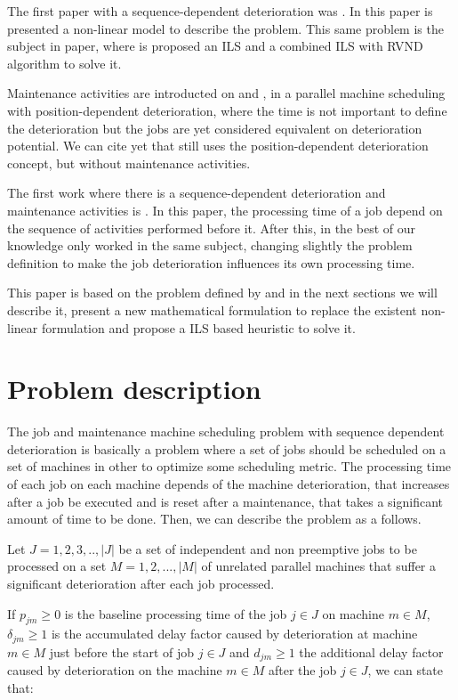 \documentclass[a4paper,11pt]{article}
\begin{document}
 The first paper with a sequence-dependent deterioration was \citep{RUIZTORRES20132051}. In this paper is presented a non-linear model to describe the problem. This same problem is the subject in \citep{SantosArroyo2015} paper, where is proposed an ILS and a combined ILS with RVND algorithm to solve it. 
 
Maintenance activities are introducted on \citep{Yang2011} and \citep{YANG20121458}, in a parallel machine scheduling with position-dependent deterioration, where the time is not important to define the deterioration but the jobs are yet considered equivalent on deterioration potential. We can cite yet \citep{HUANG20152897} that still uses the position-dependent deterioration concept, but without maintenance activities.
 
The first work where there is a sequence-dependent deterioration and maintenance activities is \citep{ruiz2017makespan}. In this paper, the processing time of a job depend on the sequence of activities performed before it. After this, in the best of our knowledge only \citep{DING201935} worked in the same subject, changing slightly the problem definition to make the job deterioration influences its own processing time. 

This paper is based on the problem defined by \citep{ruiz2017makespan} and in the next sections we will describe it, present a new mathematical formulation to replace the existent non-linear formulation and propose a ILS based heuristic to solve it. 
 
\section{Problem description}

The job and maintenance machine scheduling problem with sequence dependent deterioration is basically a problem where a set of jobs should be scheduled on a set of machines in other to optimize some scheduling metric. The processing time of each job on each machine depends of the machine deterioration, that increases after a job be executed and is reset after a maintenance, that takes a significant amount of time to be done. Then, we can describe the problem as a follows. 

Let $J={1, 2, 3,..,|J|}$ be a set of independent and non preemptive jobs to be processed on a set $M = {1, 2, ..., |M|}$ of unrelated parallel machines that suffer a significant deterioration after each job processed.

If $p_{jm} \geq 0 $ is the baseline processing time of the job $j \in J$ on machine $m \in M$, $\delta_{jm} \geq 1$ is the accumulated delay factor caused by deterioration at machine $m \in M$ just before the start of job $j \in J$ and $d_{jm} \geq 1$ the additional delay factor caused by deterioration on the machine $m \in M$ after the job $j \in J$, we can state that:
\end{document}

